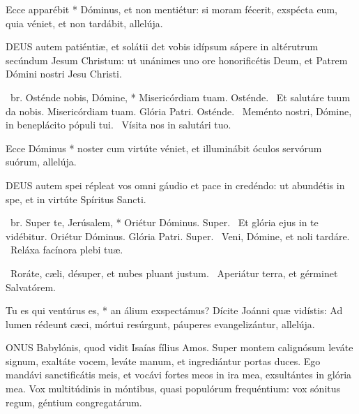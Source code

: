 
 Ecce apparébit * Dóminus, et non mentiétur: si moram fécerit, exspécta eum, quia véniet, et non tardábit, allelúja.


\lettrine[lines=2]{D}{EUS} autem patiéntiæ, et solátii det vobis idípsum sápere in altérutrum secúndum Jesum Christum: ut unánimes uno ore honorificétis Deum, et Patrem Dómini nostri Jesu Christi.

\R\ br. Osténde nobis, Dómine, * Misericórdiam tuam. Osténde. \V\ Et salutáre tuum da nobis. Misericórdiam tuam. Glória Patri. Osténde. \V\ Meménto nostri, Dómine, in beneplácito pópuli tui. \R\ Vísita nos in salutári tuo.


 Ecce Dóminus * noster cum virtúte véniet, et illuminábit óculos servórum suórum, allelúja.


\lettrine[lines=2]{D}{EUS} autem spei répleat vos omni gáudio et pace in credéndo: ut abundétis in spe, et in virtúte Spíritus Sancti.

\R\ br. Super te, Jerúsalem, * Oriétur Dóminus. Super. \V\ Et glória ejus in te vidébitur. Oriétur Dóminus. Glória Patri. Super. \V\ Veni, Dómine, et noli tardáre. \R\ Reláxa facínora plebi tuæ.




\V\ Roráte, cæli, désuper, et nubes pluant justum. \R\ Aperiátur terra, et gérminet Salvatórem.

 Tu es qui ventúrus es, * an álium exspectámus? Dícite Joánni quæ vidístis: Ad lumen rédeunt cæci, mórtui resúrgunt, páuperes evangelizántur, allelúja.

\sectionornament




\lettrine[lines=2]{O}{NUS} Babylónis, quod vidit Isaías fílius Amos. Super montem calignósum leváte signum, exaltáte vocem, leváte manum, et ingrediántur portas duces. Ego mandávi sanctificátis meis, et vocávi fortes meos in ira mea, exsultántes in glória mea. Vox multitúdinis in móntibus, quasi populórum frequéntium: vox sónitus regum, géntium congregatárum.

